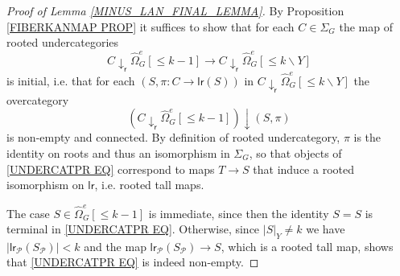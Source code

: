 \documentclass[a4paper,10pt
,draft
]{article}%
\numberwithin{equation}{section}
\numberwithin{figure}{section}
\theoremstyle{definition} %
\newcommand{\1}{\ensuremath{\mathbbm 1}}%
\begin{document}
\begin{proof}[Proof of Lemma \ref{MINUS_LAN_FINAL_LEMMA}]

By Proposition \ref{FIBERKANMAP PROP} it suffices to
show that for each $C \in \Sigma_G$
the map of rooted undercategories
\[
C \downarrow_{\mathsf{r}} \widehat{\Omega}_G^e[\leq\! k-1]
	\to 
C \downarrow_{\mathsf{r}} \widehat{\Omega}_G^e[\leq\! k \mathbin{\backslash} Y]
\]
is initial, i.e. 
\cite[IX.3]{McL} that for each
$(S,\pi \colon C \to \mathsf{lr}(S))$ in 
$C \downarrow_{\mathsf{r}} \widehat{\Omega}_G^e[\leq\! k \mathbin{\backslash} Y]$
the overcategory
\begin{equation}\label{UNDERCATPR EQ}
	(C \downarrow_{\mathsf{r}} \widehat{\Omega}_G^e[\leq\! k-1])
		\downarrow
	(S,\pi)  
\end{equation}
is non-empty and connected. 
By definition of rooted undercategory, $\pi$ is the identity on roots and thus an isomorphism in $\Sigma_G$,
so that objects of \eqref{UNDERCATPR EQ}
correspond to maps
$T \to S$
that induce a rooted isomorphism on 
$\mathsf{lr}$, i.e. rooted tall maps.

The case $S\in \widehat{\Omega}_G^e[\leq\! k-1]$ is immediate,
since then the identity $S = S$ is terminal in 
\eqref{UNDERCATPR EQ}.
Otherwise, since $|S|_Y \neq k$ we have
$|\mathsf{lr}_{\mathcal{P}}(S_{\mathcal{P}})|<k$
and the map 
$\mathsf{lr}_{\mathcal{P}}(S_{\mathcal{P}}) \to S$,
which is a rooted tall map, shows that
\eqref{UNDERCATPR EQ} is indeed non-empty.



\end{proof}
\end{document}
